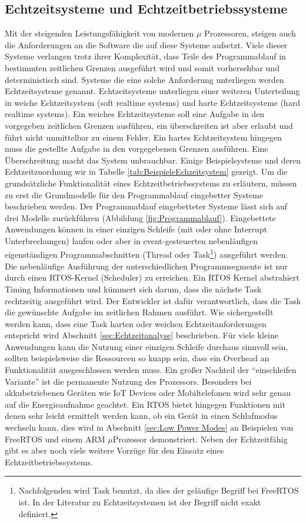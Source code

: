 \subsection{Echtzeitsysteme und Echtzeitbetriebssysteme}
Mit der steigenden Leistungsfähigkeit von modernen $\mu$ Prozessoren, steigen auch die Anforderungen an die Software die auf diese Systeme aufsetzt. Viele dieser Systeme verlangen trotz ihrer Komplexität, dass Teile des Programmablauf in bestimmten zeitlichen Grenzen ausgeführt wird und somit vorhersehbar und deterministisch sind. Systeme die eine solche Anforderung unterliegen werden Echtzeitsysteme genannt. Echtzeitsysteme unterliegen einer weiteren Unterteilung in weiche Echtzeitsystem (soft realtime systems) und harte Echtzeitsysteme (hard realtime systems). Ein weiches Echtzeitsysteme soll eine Aufgabe in den vorgegeben zeitlichen Grenzen ausführen, ein über\-schreiten ist aber erlaubt und führt nicht unmittelbar zu einem Fehler. Ein hartes Echtzeitsystem hingegen muss die gestellte Aufgabe in den vorgegebenen Grenzen ausführen. Eine Überschreitung macht das System unbrauchbar. Einige Beispielsysteme und deren Echtzeitzuordnung wir in Tabelle \ref{tab:BeispieleEchzeitsystem} gezeigt. Um die grundsätzliche Funktionalität eines Echtzeitbetriebssystems zu erläutern, müssen zu erst die Grundmodelle für den Programmablauf eingebetter Systeme beschrieben werden. Der Programmablauf eingebetteter Systeme lässt sich auf drei Modelle zurückführen (Abbildung \ref{fig:Programmablauf}). Eingebettete Anwendungen können in einer einzigen Schleife (mit oder ohne Interrupt Unterbrechungen) laufen oder aber in event-gesteuerten nebenläufigen eigenständigen Programmabschnitten (Thread oder Task\footnote{Nachfolgenden wird Task benutzt, da dies der geläufige Begriff bei FreeRTOS ist. In der Literatur zu Echtzeitsystemen ist der Begriff nicht exakt definiert.}) ausgeführt werden. Die nebenläufige Ausführung der unterschiedlichen Programmsegmente ist nur durch einen RTOS-Kernel (Scheduler) zu erreichen. Ein RTOS Kernel abstrahiert Timing Informationen und kümmert sich darum, dass die nächste Task rechtzeitig ausgeführt wird. Der Entwickler ist dafür verantwortlich, dass die Task die gewünschte Aufgabe im zeitlichen Rahmen ausführt. Wie sichergestellt werden kann, dass eine Task  harten oder weichen Echtzeitanforderungen entspricht wird Abschnitt \ref{sec:Echtzeitanalyse} beschrieben. Für viele kleine Anwendungen kann die Nutzung einer einzigen Schleife durchaus sinnvoll sein, sollten beispielsweise die Ressourcen so knapp sein, dass ein Overhead an Funktionalität ausgeschlossen werden muss. Ein großer Nachteil der "`einschleifen Variante"' ist die permanente Nutzung des Prozessors. Besonders bei akkubetriebenen Geräten wie IoT Devices oder Mobiltelefonen wird sehr genau auf die Energieaufnahme geachtet. Ein RTOS bietet hingegen Funktionen mit denen sehr leicht ermittelt werden kann, ob ein Gerät in einen Schlafmodus wechseln kann, dies wird in Abschnitt \ref{sec:Low Power Modes} an Beispielen von FreeRTOS und einem ARM $\mu$Prozessor demonstriert. Neben der Echtzeitfähig gibt es aber noch viele weitere Vorzüge für den Einsatz eines Echtzeitbetriebssystems.  
